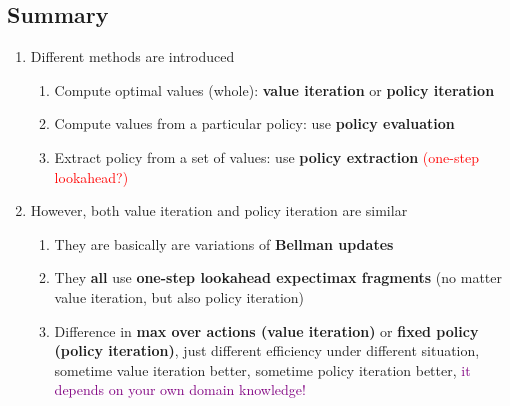 \subsection{Summary}
\begin{enumerate}
    \item Different methods are introduced
    \begin{enumerate}
        \item Compute optimal values (whole): \textbf{value iteration} or \textbf{policy iteration}
        \item Compute values from a particular policy: use \textbf{policy evaluation}
        \item Extract policy from a set of values: use \textbf{policy extraction} \textcolor{red}{(one-step lookahead?)}
    \end{enumerate}
    \item However, both value iteration and policy iteration are similar
    \begin{enumerate}
        \item They are basically are variations of \textbf{Bellman updates}
        \item They \textbf{all} use \textbf{one-step lookahead expectimax fragments} (no matter value iteration, but also policy iteration)
        \item Difference in \textbf{max over actions (value iteration)} or \textbf{fixed policy (policy iteration)}, just different efficiency under different situation, sometime value iteration better, sometime policy iteration better, \textcolor{purple}{it depends on your own domain knowledge!}
    \end{enumerate}
\end{enumerate}

\pagebreak